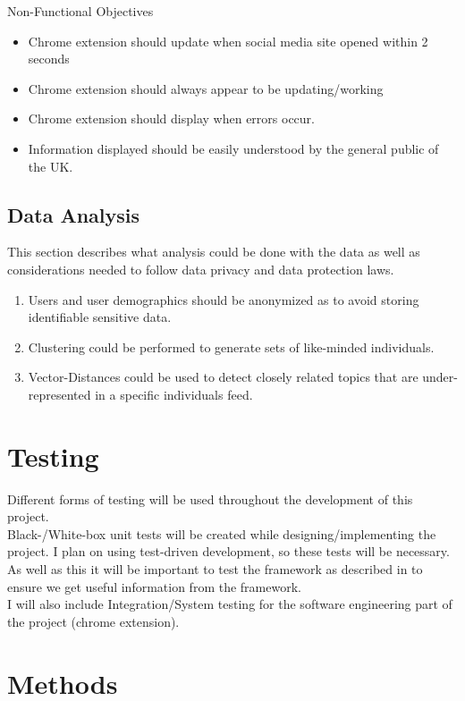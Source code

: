 \documentclass[a4paper,fleqn,10pt]{article}
\begin{document}
Non-Functional Objectives
\begin{itemize}
    \item Chrome extension should update when social media site opened within 2 seconds
    \item Chrome extension should always appear to be updating/working
    \item Chrome extension should display when errors occur.
    \item Information displayed should be easily understood by the general public of the UK.
\end{itemize}

\subsection{Data Analysis}
\label{subsec:analysis}
This section describes what analysis could be done with the data as well as considerations needed to
follow data privacy and data protection laws.
\begin{enumerate}
    \item Users and user demographics should be anonymized as to avoid storing identifiable sensitive data.
    \item Clustering could be performed to generate sets of like-minded individuals.
    \item Vector-Distances could be used to detect closely related topics that are under-represented in a specific individuals feed.
\end{enumerate}

\section{Testing}
\label{sec:testing}
Different forms of testing will be used throughout the development of this project.\\
Black-/White-box unit tests will be created while designing/implementing the project. I plan on using test-driven development,
so these tests will be necessary.\\
As well as this it will be important to test the framework as described in  to ensure we get useful
information from the framework.\\
I will also include Integration/System testing for the software engineering part of the project (chrome extension).

\section{Methods}
\label{sec:methods}
\end{document}
